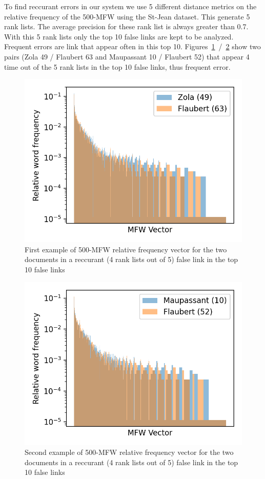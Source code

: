To find reccurant errors in our system we use 5 different distance metrics on the relative frequency of the 500-MFW using the St-Jean dataset.
This generate 5 rank lists.
The average precision for these rank list is always greater than 0.7.
With this 5 rank lists only the top 10 false links are kept to be analyzed.
Frequent errors are link that appear often in this top 10.
Figures~\ref{fig:mfw_vector_error_0}~/~\ref{fig:mfw_vector_error_1} show two pairs (Zola 49 / Flaubert 63 and Maupassant 10 / Flaubert 52) that appear 4 time out of the 5 rank lists in the top 10 false links, thus frequent error.

\begin{figure}
  \includegraphics[width=\linewidth]{img/mfw_vector_error_0.png}
  \caption{First example of 500-MFW relative frequency vector for the two documents in a reccurant (4 rank lists out of 5) false link in the top 10 false links}
  \label{fig:mfw_vector_error_0}
\end{figure}
\begin{figure}
  \includegraphics[width=\linewidth]{img/mfw_vector_error_1.png}
  \caption{Second example of 500-MFW relative frequency vector for the two documents in a reccurant (4 rank lists out of 5) false link in the top 10 false links}
  \label{fig:mfw_vector_error_1}
\end{figure}

